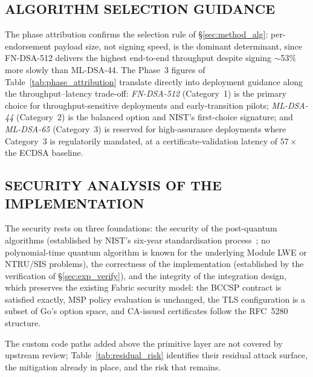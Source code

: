 \documentclass{ieeetj}
\begin{document}
\subsection{ALGORITHM SELECTION GUIDANCE}
\label{sec:res_selection}

The phase attribution confirms the selection rule of
\S\ref{sec:method_alg}: per-endorsement payload size, not signing
speed, is the dominant determinant, since FN-DSA-512 delivers the highest
end-to-end throughput despite signing $\sim$53\% more slowly than
ML-DSA-44. The Phase~3 figures of
Table~\ref{tab:phase_attribution} translate directly into deployment
guidance along the throughput--latency trade-off: \emph{FN-DSA-512}
(Category~1) is the primary choice for throughput-sensitive deployments
and early-transition pilots; \emph{ML-DSA-44} (Category~2) is the
balanced option and NIST's first-choice signature; and
\emph{ML-DSA-65} (Category~3) is reserved for high-assurance deployments
where Category~3 is regulatorily mandated, at a certificate-validation
latency of $57\times$ the ECDSA baseline.

\subsection{SECURITY ANALYSIS OF THE IMPLEMENTATION}
\label{sec:res_security}

The security rests on three foundations: the security of the post-quantum
algorithms (established by NIST's six-year standardisation
process~\cite{alagic2022nist}; no polynomial-time quantum algorithm is known for
the underlying Module LWE or NTRU/SIS problems), the correctness of the
implementation (established by the verification of
\S\ref{sec:exp_verify}), and the integrity of
the integration design, which preserves the existing Fabric
security model: the BCCSP contract is satisfied exactly, MSP policy evaluation is
unchanged, the TLS configuration is a subset of Go's option space, and CA-issued
certificates follow the RFC~5280 structure.

The custom code paths added above the primitive layer are not covered by
upstream review; Table~\ref{tab:residual_risk} identifies their residual
attack surface, the mitigation already in place, and the risk that
remains.
\end{document}

